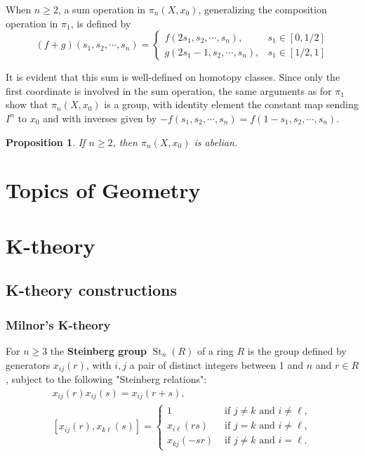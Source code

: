 \documentclass{book}
\newtheorem{prop}{Proposition}
\begin{document}
When $n \geq 2$, a sum operation in $\pi_n\left(X, x_0\right)$, generalizing the composition operation in $\pi_1$, is defined by
$$
(f+g)\left(s_1, s_2, \cdots, s_n\right)= \begin{cases}f\left(2 s_1, s_2, \cdots, s_n\right), & s_1 \in[0,1 / 2] \\ g\left(2 s_1-1, s_2, \cdots, s_n\right), & s_1 \in[1 / 2,1]\end{cases}
$$

It is evident that this sum is well-defined on homotopy classes. Since only the first coordinate is involved in the sum operation, the same arguments as for $\pi_1$ show that $\pi_n\left(X, x_0\right)$ is a group, with identity element the constant map sending $I^n$ to $x_0$ and with inverses given by $-f\left(s_1, s_2, \cdots, s_n\right)=f\left(1-s_1, s_2, \cdots, s_n\right)$.


\begin{prop}
    If $n \geq 2$, then $\pi_n\left(X, x_0\right)$ is abelian.
\end{prop}




\part{Topics of Geometry}




\part{K-theory}
\chapter{K-theory constructions} 

\section{Milnor's K-theory}

For $n \geq 3$ the \textbf{Steinberg group} $\operatorname{St}_n(R)$ of a ring $R$ is the group defined by generators $x_{i j}(r)$, with $i, j$ a pair of distinct integers between 1 and $n$ and $r \in R$, subject to the following "Steinberg relations":
$$
\begin{gathered}
x_{i j}(r) x_{i j}(s)=x_{i j}(r+s), \\
{\left[x_{i j}(r), x_{k \ell}(s)\right]= \begin{cases}1 & \text { if } j \neq k \text { and } i \neq \ell, \\
x_{i \ell}(r s) & \text { if } j=k \text { and } i \neq \ell, \\
x_{k j}(-s r) & \text { if } j \neq k \text { and } i=\ell .\end{cases} }
\end{gathered}
$$
\end{document}
